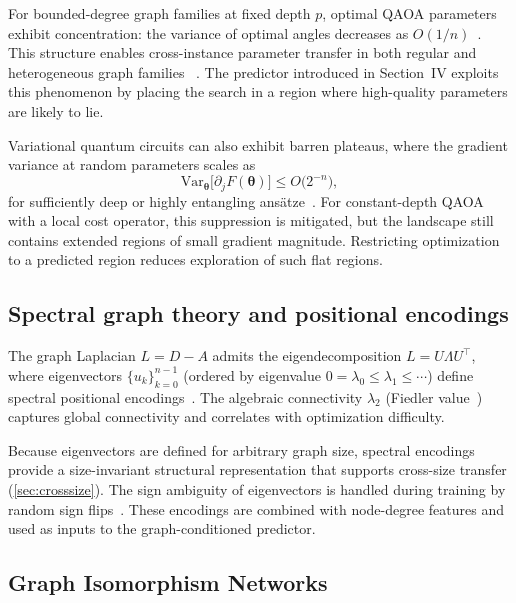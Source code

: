 \documentclass[aps,prx,reprint,superscriptaddress,longbibliography]{revtex4-2}
\newcommand{\QAOA}{\textnormal{\textsc{QAOA}}}
\begin{document}
For bounded-degree graph families at fixed depth $p$, optimal
\QAOA{} parameters exhibit concentration: the variance of optimal
angles decreases as $O(1/n)$~\cite{brandao2018,akshay2021}. This
structure enables cross-instance parameter transfer
in both regular and heterogeneous graph families
~\cite{wurtz2021,galda2021}. The predictor introduced in
Section~IV exploits this phenomenon by placing the search in a region
where high-quality parameters are likely to lie.

Variational quantum circuits can also exhibit barren plateaus,
where the gradient variance at random parameters scales as
\begin{equation}
    \mathrm{Var}_{\bm\theta}\bigl[\partial_j F(\bm\theta)\bigr]
    \le O\bigl(2^{-n}\bigr),
    \label{eq:bp}
\end{equation}
for sufficiently deep or highly entangling
ans\"atze~\cite{mcclean2018,arrasmith2021,wang2021noise}.
For constant-depth \QAOA{} with a local cost operator, this
suppression is mitigated, but the landscape still contains extended
regions of small gradient magnitude. Restricting optimization to a
predicted region reduces exploration of such flat regions.

\subsection{Spectral graph theory and positional encodings}
\label{sec:spectral_bg}

The graph Laplacian $L = D - A$ admits the eigendecomposition
$L = U\Lambda U^\top$, where eigenvectors
$\{u_k\}_{k=0}^{n-1}$ (ordered by eigenvalue
$0 = \lambda_0 \le \lambda_1 \le \cdots$) define spectral positional
encodings~\cite{dwivedi2023,lim2023,kreuzer2021}. The algebraic
connectivity $\lambda_2$ (Fiedler value~\cite{fiedler1973}) captures
global connectivity and correlates with optimization difficulty.

Because eigenvectors are defined for arbitrary graph size, spectral
encodings provide a size-invariant structural representation that
supports cross-size transfer (\cref{sec:crosssize}). The sign ambiguity
of eigenvectors is handled during training by random sign
flips~\cite{lim2023}. These encodings are combined with node-degree
features and used as inputs to the graph-conditioned predictor.

\subsection{Graph Isomorphism Networks}
\end{document}
